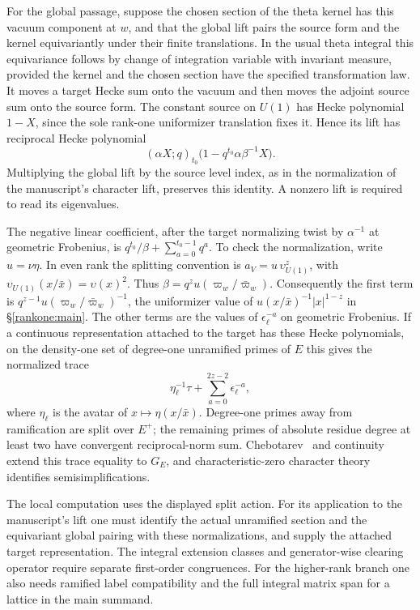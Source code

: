 For the global passage, suppose the chosen section of the theta
kernel has this vacuum component at $w$, and that the global lift
pairs the source form and the kernel equivariantly under their finite
translations. In the usual theta integral this equivariance follows
by change of integration variable with invariant measure, provided
the kernel and the chosen section have the specified transformation
law. It moves a target Hecke sum onto the vacuum and then moves the
adjoint source sum onto the source form. The constant source on $U(1)$
has Hecke polynomial $1-X$, since the sole rank-one uniformizer
translation fixes it. Hence its lift has reciprocal Hecke polynomial
\[
 (\alpha X;q)_{t_0}\bigl(1-q^{t_0}\alpha\beta^{-1}X\bigr).
\]
Multiplying the global lift by the source level index, as in the
normalization of the manuscript's character lift, preserves this
identity. A nonzero lift is required to read its eigenvalues.

The negative linear coefficient, after the target normalizing twist
by $\alpha^{-1}$ at geometric Frobenius, is
$q^{t_0}/\beta+\sum_{a=0}^{t_0-1}q^a$.
To check the normalization, write $u=\nu\eta$. In even rank the
splitting convention is $a_V=u\,\upsilon_{U(1)}^{z}$, with
$\upsilon_{U(1)}(x/\bar x)=\upsilon(x)^2$. Thus
$\beta=q^{z}u(\varpi_w/\bar\varpi_w)$.
Consequently the first term is $q^{z-1}u(\varpi_w/\bar\varpi_w)^{-1}$,
the uniformizer value of $u(x/\bar x)^{-1}|x|^{1-z}$ in \S\ref{rankone:main}.
The other terms are the values of $\epsilon_\ell^{-a}$ on geometric
Frobenius. If a continuous representation attached to the target
has these Hecke polynomials, on the density-one set of degree-one
unramified primes of $E$ this gives the normalized trace
\[
 \eta^{-1}_{\ell}\tau+\sum_{a=0}^{2z-2}\epsilon_\ell^{-a},
\]
where $\eta_\ell$ is the avatar of $x\mapsto\eta(x/\bar x)$.
Degree-one primes away from ramification are split over $E^+$;
the remaining primes of absolute residue degree at least two have
convergent reciprocal-norm sum. Chebotarev~\cite[Theorem~8.31]{milneANT} and continuity extend this
trace equality to $G_E$, and characteristic-zero character theory
identifies semisimplifications.

The local computation uses the displayed split action. For its
application to the manuscript's lift one must identify the actual
unramified section and the equivariant global pairing with these
normalizations, and supply the attached target representation.
The integral extension classes and generator-wise clearing operator
require separate first-order congruences. For the higher-rank branch
one also needs ramified label compatibility and the full integral
matrix span for a lattice in the main summand.

